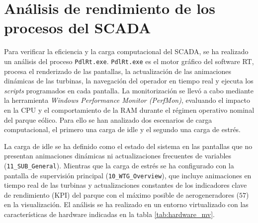 \section{Análisis de rendimiento de los procesos del SCADA}
\label{subsec:rendimiento_scada}
Para verificar la eficiencia y la carga computacional del \ac{SCADA}, se ha realizado un análisis del proceso \texttt{PdlRt.exe}. \texttt{PdlRt.exe} es el motor gráfico del software \ac{RT}, procesa el renderizado de las pantallas, la actualización de las animaciones dinámicas de las turbinas, la navegación del operador en tiempo real y ejecuta los \textit{scripts} programados en cada pantalla. La monitorización se llevó a cabo mediante la herramienta \textit{Windows Performance Monitor (PerfMon)}, evaluando el impacto en la \ac{CPU} y el comportamiento de la \ac{RAM} durante el régimen operativo nominal del parque eólico. Para ello se han analizado dos escenarios de carga computacional, el primero una carga de idle y el segundo una carga de estrés.\par 

La carga de idle se ha definido como el estado del sistema en las pantallas que no presentan animaciones dinámicas ni actualizaciones frecuentes de variables (\texttt{11\_SUB\_General}). Mientras que la carga de estrés se ha configurado con la pantalla de supervisión principal (\texttt{10\_WTG\_Overview}), que incluye animaciones en tiempo real de las turbinas y actualizaciones constantes de los indicadores clave de rendimiento (KPI) del parque con el máximo posible de aerogeneradores ($57$) en la visualización. El análisis se ha realizado en un entorno virtualizado con las características de hardware indicadas en la tabla \ref{tab:hardware_mv}.\par 


\begin{table}[tbp]
\centering
\caption{Especificaciones del entorno de hardware y virtualización.}
\label{tab:hardware_mv}
\end{table}

